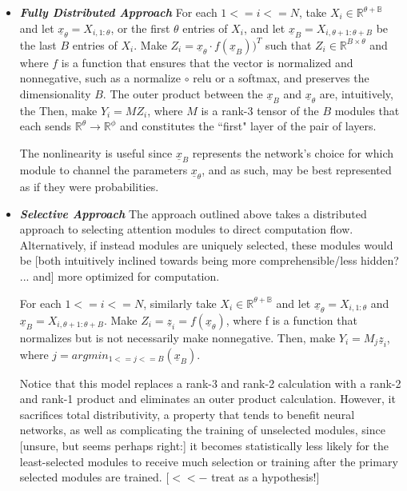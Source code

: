 \documentclass[12pt]{article}
\begin{document}
\begin{itemize}

\item \label{Fully Distributed} \textit{\textbf{Fully Distributed Approach}} For each $1<=i<=N$, take $X_i \in \mathbb{R^{\theta+B}}$ and let $\underline{x}_\theta = X_{i,1:\theta}$, or the first $\theta$ entries of $X_i$, and let $\underline{x}_B = X_{i, \theta+1:\theta+B}$ be the last $B$ entries of $X_i$.  Make $Z_i = \underline{x}_\theta \cdot f(\underline{x}_B))^{T}$ such that $Z_i \in \mathbb{R}^{B\times\theta}$ and where $f$ is a function that ensures that the vector is normalized and nonnegative, such as a normalize $\circ$ relu or a softmax, and preserves the dimensionality $B$.  The outer product between the $\underline{x}_B$ and $\underline{x}_\theta$ are, intuitively, the  Then, make $Y_i = MZ_i$, where $M$ is a rank-3 tensor of the $B$ modules that each sends $\mathbb{R}^{\theta}\rightarrow\mathbb{R}^{\phi}$ and constitutes the ``first" layer of the pair of layers.
\par The nonlinearity is useful since $\underline{x}_B$ represents the network's choice for which module to channel the parameters $\underline{x}_\theta$, and as such, may be best represented as if they were probabilities.

\item \label{Selective Approach} \textit{\textbf{Selective Approach}} The approach outlined above takes a distributed approach to selecting attention modules to direct computation flow.  Alternatively, if instead modules are uniquely selected, these modules would be [both intuitively inclined towards being more comprehensible/less hidden? ... and] more optimized for computation.\par
For each $1<=i<=N$, similarly take $X_i \in \mathbb{R^{\theta+B}}$ and let $\underline{x}_\theta = X_{i,1:\theta}$ and $\underline{x}_B = X_{i, \theta+1:\theta+B}$.  Make $Z_i = \underline{z}_i = f(\underline{x}_\theta)$, where f is a function that normalizes but is not necessarily make nonnegative.  Then, make $Y_i = M_j\underline{z}_i$, where $j = argmin_{1<=j<=B} ( \underline{x}_B )$.  \par
Notice that this model replaces a rank-3 and rank-2 calculation with a rank-2 and rank-1 product and eliminates an outer product calculation.  However, it sacrifices total distributivity, a property that tends to benefit neural networks, as well as complicating the training of unselected modules, since [unsure, but seems perhaps right:] it becomes statistically less likely for the least-selected modules to receive much selection or training after the primary selected modules are trained. [$<<-$ treat as a hypothesis!] \par



\end{itemize}
\end{document}
